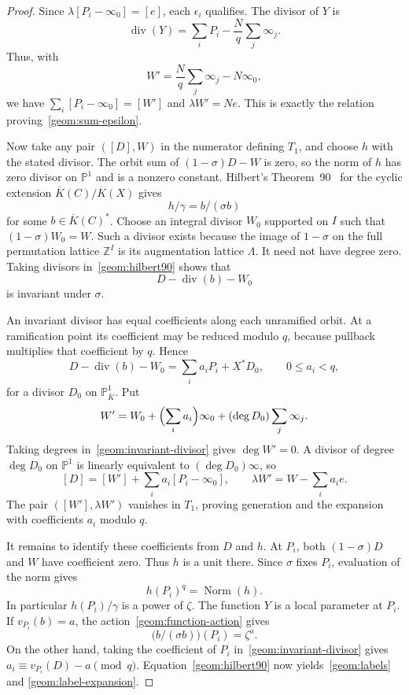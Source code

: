 \begin{proof}
Since $\lambda[P_i-\infty_0]=[e]$, each $\epsilon_i$ qualifies.
The divisor of $Y$ is
\[
                 \operatorname{div}(Y)=\sum_iP_i-
                                      \frac Nq\sum_j\infty_j.
\]
Thus, with
\[
                   W'=\frac Nq\sum_j\infty_j-N\infty_0,
\]
we have $\sum_i[P_i-\infty_0]=[W']$ and $\lambda W'=Ne$.
This is exactly the relation proving~\eqref{geom:sum-epsilon}.

Now take any pair $([D],W)$ in the numerator defining $T_1$, and choose
$h$ with the stated divisor.  The orbit sum of $(1-\sigma)D-W$ is zero,
so the norm of $h$ has zero divisor on $\mathbb P^1$ and is a nonzero
constant.  Hilbert's Theorem~90~\cite[Example 2.3.4]{GilleSzamuely06}
for the cyclic extension
$\overline K(C)/\overline K(X)$ gives
\begin{equation}
                          h/\gamma=b/(\sigma b)
\label{geom:hilbert90}
\end{equation}
for some $b\in\overline K(C)^*$.
Choose an integral divisor $W_0$ supported on $I$ such that
$(1-\sigma)W_0=W$.  Such a divisor exists because the image of
$1-\sigma$ on the full permutation lattice $\mathbb Z^I$ is its
augmentation lattice $\Lambda$.  It need not have degree zero.
Taking divisors in~\eqref{geom:hilbert90} shows that
\[
                      D-\operatorname{div}(b)-W_0
\]
is invariant under $\sigma$.

An invariant divisor has equal coefficients along each unramified orbit.
At a ramification point its coefficient may be reduced modulo $q$, because
pullback multiplies that coefficient by $q$.  Hence
\begin{equation}
           D-\operatorname{div}(b)-W_0
                =\sum_i a_iP_i+X^*D_0,
          \qquad 0\le a_i<q,
\label{geom:invariant-divisor}
\end{equation}
for a divisor $D_0$ on $\mathbb P^1_{\overline K}$.
Put
\[
       W'=W_0+\Bigl(\sum_i a_i\Bigr)\infty_0
                       +(\deg D_0)\sum_j\infty_j.
\]
Taking degrees in~\eqref{geom:invariant-divisor} gives $\deg W'=0$.
A divisor of degree $\deg D_0$ on $\mathbb P^1$ is linearly equivalent
to $(\deg D_0)\infty$, so
\[
       [D]=[W']+\sum_i a_i[P_i-\infty_0],\qquad
       \lambda W'=W-\sum_i a_i e.
\]
The pair $([W'],\lambda W')$ vanishes in $T_1$, proving generation
and the expansion with coefficients $a_i$ modulo $q$.

It remains to identify these coefficients from $D$ and $h$.
At $P_i$, both $(1-\sigma)D$ and $W$ have coefficient zero.
Thus $h$ is a unit there.  Since $\sigma$ fixes $P_i$, evaluation of the
norm gives
\[
                          h(P_i)^q=\operatorname{Norm}(h).
\]
In particular $h(P_i)/\gamma$ is a power of $\zeta$.
The function $Y$ is a local parameter at $P_i$.  If
$v_{P_i}(b)=a$, the action~\eqref{geom:function-action} gives
\[
                         \bigl(b/(\sigma b)\bigr)(P_i)=\zeta^a.
\]
On the other hand, taking the coefficient of $P_i$
in~\eqref{geom:invariant-divisor} gives
$a_i\equiv v_{P_i}(D)-a\pmod q$.
Equation~\eqref{geom:hilbert90} now yields~\eqref{geom:labels} and
\eqref{geom:label-expansion}.
\end{proof}

